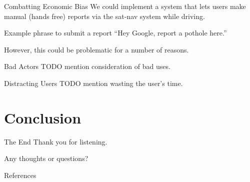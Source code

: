 \documentclass{beamer}
\begin{document}
\begin{frame}{Combatting Economic Bias}
    We could implement a system that lets users make manual (hands free) reports via the sat-nav system while driving.

    \begin{exampleblock}{Example phrase to submit a report}
        ``Hey Google, report a pothole here.''
    \end{exampleblock}

    However, this could be problematic for a number of reasons.
\end{frame}

\begin{frame}{Bad Actors}
    TODO mention consideration of bad uses.
\end{frame}

\begin{frame}{Distracting Users}
    TODO mention wasting the user's time.
\end{frame}

\section{Conclusion}

\begin{frame}{The End}
    Thank you for listening.
    
    Any thoughts or questions?
\end{frame}

\begin{frame}[allowframebreaks]{References}
    \printbibliography
\end{frame}
\end{document}
